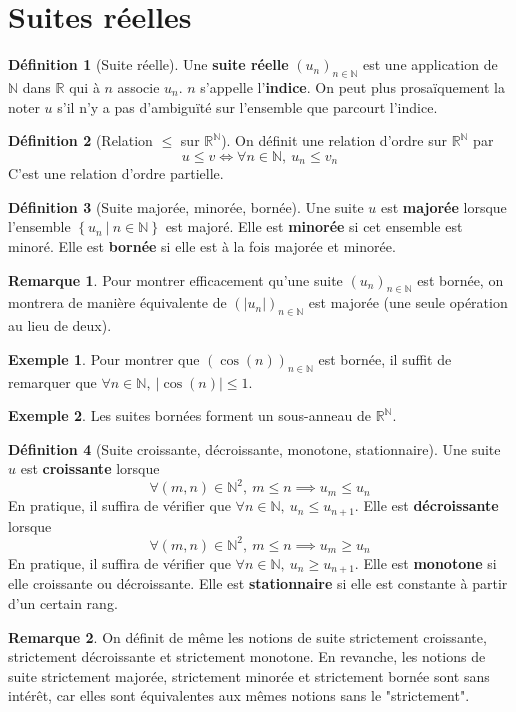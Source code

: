 \documentclass[french]{book}
\newcommand{\N}{\mathbb{N}}
\newcommand{\R}{\mathbb{R}}
\theoremstyle{plain}
\theoremstyle{definition}
\newtheorem{dfn}{Définition}[chapter]
\newtheorem{exa}{Exemple}[chapter]
\newtheorem{rmq}{Remarque}[chapter]
\theoremstyle{remark}
\begin{document}
\section{Suites réelles}
\begin{dfn}[Suite réelle]
	Une \textbf{suite réelle} $(u_n)_{n\in\N}$ est une application de $\N$ dans $\R$ qui à $n$ associe $u_n$. $n$ s'appelle l'\textbf{indice}. On peut plus prosaïquement la noter $u$ s'il n'y a pas d'ambiguïté sur l'ensemble que parcourt l'indice.
\end{dfn}
\begin{dfn}[Relation $\leqslant$ sur $\R^\N$]
	On définit une relation d'ordre sur $\R^\N$ par $$u\leqslant v\iff \forall n\in\N,\ u_n\leqslant v_n$$ C'est une relation d'ordre partielle.
\end{dfn}
\begin{dfn}[Suite majorée, minorée, bornée]
	Une suite $u$ est \textbf{majorée} lorsque l'ensemble $\left\{u_n\ | \ n\in\N\right\}$ est majoré. Elle est \textbf{minorée} si cet ensemble est minoré. Elle est \textbf{bornée} si elle est à la fois majorée et minorée.
\end{dfn}
\begin{rmq}
	Pour montrer efficacement qu'une suite $(u_n)_{n\in\N}$ est bornée, on montrera de manière équivalente de $(\lvert u_n\rvert)_{n\in\N}$ est majorée (une seule opération au lieu de deux).
\end{rmq}
\begin{exa}
	Pour montrer que $(\cos(n))_{n\in\N}$ est bornée, il suffit de remarquer que $\forall n\in\N,\ \lvert\cos(n)\rvert\leqslant1$.
\end{exa}
\begin{exa}
	Les suites bornées forment un sous-anneau de $\R^\N$.
\end{exa}
\begin{dfn}[Suite croissante, décroissante, monotone, stationnaire]
	Une suite $u$ est \textbf{croissante} lorsque $$\forall(m,n)\in\N^2,\ m\leqslant n \implies u_m\leqslant u_n$$ En pratique, il suffira de vérifier que $\forall n\in\N,\ u_n\leqslant u_{n+1}$. Elle est \textbf{décroissante} lorsque $$\forall(m,n)\in\N^2,\ m\leqslant n \implies u_m\geqslant u_n$$ En pratique, il suffira de vérifier que $\forall n\in\N,\ u_n\geqslant u_{n+1}$. Elle est \textbf{monotone} si elle croissante ou décroissante. Elle est \textbf{stationnaire} si elle est constante à partir d'un certain rang.
\end{dfn}
\begin{rmq}
	On définit de même les notions de suite strictement croissante, strictement décroissante et strictement monotone. En revanche, les notions de suite strictement majorée, strictement minorée et strictement bornée sont sans intérêt, car elles sont équivalentes aux mêmes notions sans le "strictement".
\end{rmq}
\end{document}
